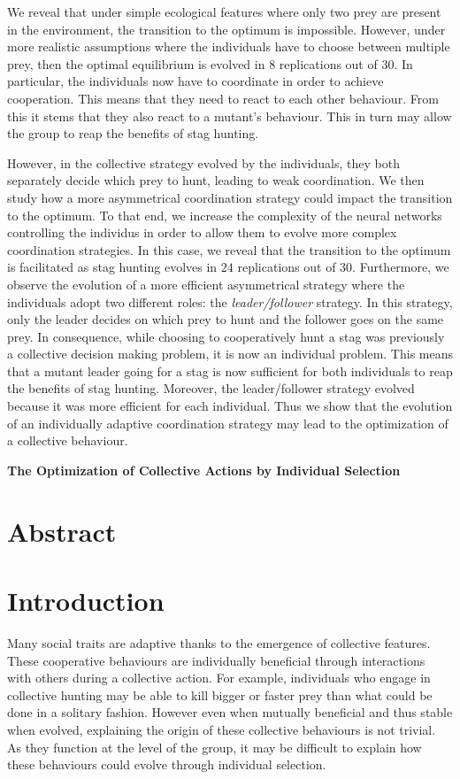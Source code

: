 We reveal that under simple ecological features where only two prey are present in the environment, the transition to the optimum is impossible. However, under more realistic assumptions where the individuals have to choose between multiple prey, then the optimal equilibrium is evolved in $8$ replications out of $30$. In particular, the individuals now have to coordinate in order to achieve cooperation. This means that they need to react to each other behaviour. From this it stems that they also react to a mutant's behaviour. This in turn may allow the group to reap the benefits of stag hunting. 

However, in the collective strategy evolved by the individuals, they both separately decide which prey to hunt, leading to weak coordination. We then study how a more asymmetrical coordination strategy could impact the transition to the optimum. To that end, we increase the complexity of the neural networks controlling the individus in order to allow them to evolve more complex coordination strategies. In this case, we reveal that the transition to the optimum is facilitated as stag hunting evolves in $24$ replications out of $30$. Furthermore, we observe the evolution of a more efficient asymmetrical strategy where the individuals adopt two different roles: the \emph{leader/follower} strategy. In this strategy, only the leader decides on which prey to hunt and the follower goes on the same prey. In consequence, while choosing to cooperatively hunt a stag was previously a collective decision making problem, it is now an individual problem. This means that a mutant leader going for a stag is now sufficient for both individuals to reap the benefits of stag hunting. Moreover, the leader/follower strategy evolved because it was more efficient for each individual. Thus we show that the evolution of an individually adaptive coordination strategy may lead to the optimization of a collective behaviour.

\clearpage

\begin{flushleft}
\textbf{\Huge The Optimization of Collective Actions by Individual Selection}
\end{flushleft}

\section{Abstract}


\section{Introduction}
  Many social traits are adaptive thanks to the emergence of collective features. These cooperative behaviours are individually beneficial through interactions with others during a collective action. For example, individuals who engage in collective hunting may be able to kill bigger or faster prey than what could be done in a solitary fashion. However even when mutually beneficial and thus stable when evolved, explaining the origin of these collective behaviours is not trivial. As they function at the level of the group, it may be difficult to explain how these behaviours could evolve through individual selection.

